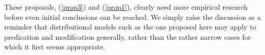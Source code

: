 \documentclass[10pt,letterpaper,twocolumn]{article}
\begin{document}
These proposals, (\ref{prop3}) and (\ref{prop1}), clearly need more empirical research before even initial conclusions can be reached. We simply raise the discussion as a reminder that distributional models such as the one proposed here may apply to predication and modification generally, rather than the rather narrow cases for which it first seems appropriate.












\end{document}
